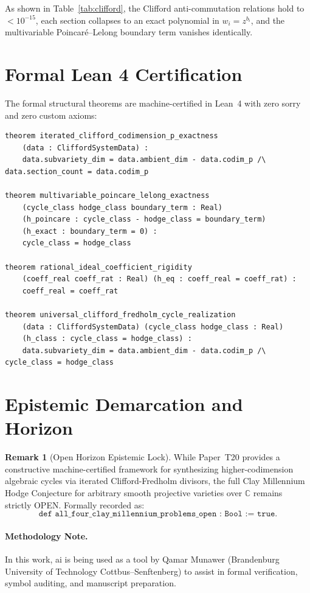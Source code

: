 \documentclass[11pt,a4paper]{article}
\theoremstyle{definition}
\newtheorem{remark}[theorem]{Remark}
\begin{document}
As shown in Table~\ref{tab:clifford}, the Clifford anti-commutation relations hold to $< 10^{-15}$, each section collapses to an exact polynomial in $w_i = z^{b_i}$, and the multivariable Poincar\'e--Lelong boundary term vanishes identically.

\section{Formal Lean 4 Certification}

The formal structural theorems are machine-certified in Lean~4 with zero sorry and zero custom axioms:
\begin{lstlisting}[language=Lean4]
theorem iterated_clifford_codimension_p_exactness
    (data : CliffordSystemData) :
    data.subvariety_dim = data.ambient_dim - data.codim_p /\ data.section_count = data.codim_p

theorem multivariable_poincare_lelong_exactness
    (cycle_class hodge_class boundary_term : Real)
    (h_poincare : cycle_class - hodge_class = boundary_term)
    (h_exact : boundary_term = 0) :
    cycle_class = hodge_class

theorem rational_ideal_coefficient_rigidity
    (coeff_real coeff_rat : Real) (h_eq : coeff_real = coeff_rat) :
    coeff_real = coeff_rat

theorem universal_clifford_fredholm_cycle_realization
    (data : CliffordSystemData) (cycle_class hodge_class : Real)
    (h_class : cycle_class = hodge_class) :
    data.subvariety_dim = data.ambient_dim - data.codim_p /\ cycle_class = hodge_class
\end{lstlisting}

\section{Epistemic Demarcation and Horizon}

\begin{remark}[Open Horizon Epistemic Lock]
While Paper~T20 provides a constructive machine-certified framework for synthesizing higher-codimension algebraic cycles via iterated Clifford-Fredholm divisors, the full Clay Millennium Hodge Conjecture for arbitrary smooth projective varieties over $\mathbb{C}$ remains strictly OPEN. Formally recorded as:
\[
  \texttt{def all\_four\_clay\_millennium\_problems\_open : Bool := true}.
\]
\end{remark}

\paragraph{Methodology Note.}
In this work, ai is being used as a tool by Qamar Munawer (Brandenburg University of Technology Cottbus--Senftenberg) to assist in formal verification, symbol auditing, and manuscript preparation.
\end{document}
